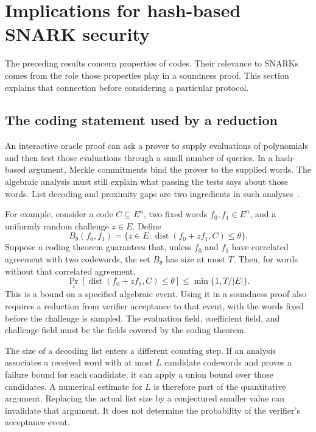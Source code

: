 \documentclass[11pt,letterpaper]{article}
\theoremstyle{definition}
\theoremstyle{remark}
\newcommand{\dist}{\operatorname{dist}}
\begin{document}


\section{Implications for hash-based SNARK security}
\label{sec:snark-security}

The preceding results concern properties of codes. Their relevance to
SNARKs comes from the role those properties play in a soundness proof.
This section explains that connection before considering a particular
protocol.

\subsection{The coding statement used by a reduction}

An interactive oracle proof can ask a prover to supply evaluations of
polynomials and then test those evaluations through a small number of
queries. In a hash-based argument, Merkle commitments bind the prover
to the supplied words. The algebraic analysis must still explain what
passing the tests says about those words. List decoding and proximity
gaps are two ingredients in such analyses~\cite{thaler,bciks}.

For example, consider a code $C\subseteq E^n$, two fixed words
$f_0,f_1\in E^n$, and a uniformly random challenge $z\in E$. Define
\[
 B_\theta(f_0,f_1)=\{z\in E:
           \dist(f_0+zf_1,C)\le\theta\}.
\]
Suppose a coding theorem guarantees that, unless $f_0$ and $f_1$
have correlated agreement with two codewords, the set $B_\theta$
has size at most $T$. Then, for words without that correlated
agreement,
\[
 \Pr_z[\dist(f_0+zf_1,C)\le\theta]
 \le\min\{1,T/|E|\}.
\]
This is a bound on a specified algebraic event. Using it in a
soundness proof also requires a reduction from verifier acceptance
to that event, with the words fixed before the challenge is sampled.
The evaluation field, coefficient field, and challenge field must
be the fields covered by the coding theorem.

The size of a decoding list enters a different counting step.
If an analysis associates a received word with at most $L$ candidate
codewords and proves a failure bound for each candidate, it can
apply a union bound over those candidates. A numerical estimate for
$L$ is therefore part of the quantitative argument. Replacing the
actual list size by a conjectured smaller value can invalidate that
argument. It does not determine the probability of the verifier's
acceptance event.
\end{document}
